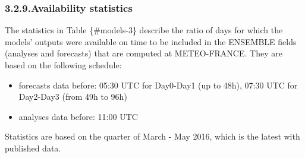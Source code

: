 \documentclass[9pt]{report}
\begin{document}
\subsubsection{3.2.9.\hspace*{0.5em}Availability statistics}\label{sec-availability-statistics}%

\noindent{}The statistics in Table \{\#models-3\} describe the ratio of days for which the models' outputs were available on time to be included in the ENSEMBLE fields (analyses and forecasts) that are computed at METEO-FRANCE. 
They are based on the following schedule:%

\begin{itemize}[noitemsep,topsep=\mdcompacttopsep]%

\item{}forecasts data before: 05:30 UTC for Day0-Day1 (up to 48h), 07:30 UTC for Day2-Day3 (from 49h to 96h)%

\item{}analyses data before: 11:00 UTC%
\end{itemize}%

\noindent{}Statistics are based on the quarter of March - May 2016, which is the latest with published data.%
\end{document}
